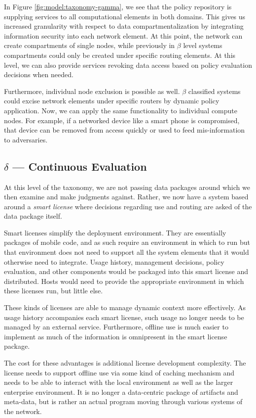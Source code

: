 \documentclass[12pt,letterpaper]{article}
\begin{document}
In Figure \ref{fig:model:taxonomy-gamma}, we see that the policy repository is supplying services to all computational elements in both domains.  This gives us increased granularity with respect to data compartmentalization by integrating information security into each network element.  At this point, the network can create compartments of single nodes, while previously in $\beta$ level systems compartments could only be created under specific routing elements.  At this level, we can also provide services revoking data access based on policy evaluation decisions when needed.

Furthermore, individual node exclusion is possible as well. $\beta$ classified systems could excise network elements under specific routers by dynamic policy application.  Now, we can apply the same functionality to individual compute nodes.  For example, if a networked device like a smart phone is compromised, that device can be removed from access quickly or used to feed mis-information to adversaries.

\subsection{$\delta$ --- Continuous Evaluation}
At this level of the taxonomy, we are not passing data packages around which we then examine and make judgments against.  Rather, we now have a system based around a \textit{smart license} where decisions regarding use and routing are asked of the data package itself.

Smart licenses simplify the deployment environment.  They are essentially packages of mobile code, and as such require an environment in which to run but that environment does not need to support all the system elements that it would otherwise need to integrate.  Usage history, management decisions, policy evaluation, and other components would be packaged into this smart license and distributed.  Hosts would need to provide the appropriate environment in which these licenses run, but little else.

These kinds of licenses are able to manage dynamic context more effectively.  As usage history accompanies each smart license, such usage no longer needs to be managed by an external service. Furthermore, offline use is much easier to implement as much of the information is omnipresent in the smart license package.

The cost for these advantages is additional license development complexity.  The license needs to support offline use via some kind of caching mechanism and needs to be able to interact with the local environment as well as the larger enterprise environment.  It is no longer a data-centric package of artifacts and meta-data, but is rather an actual program moving through various systems of the network.
\end{document}
